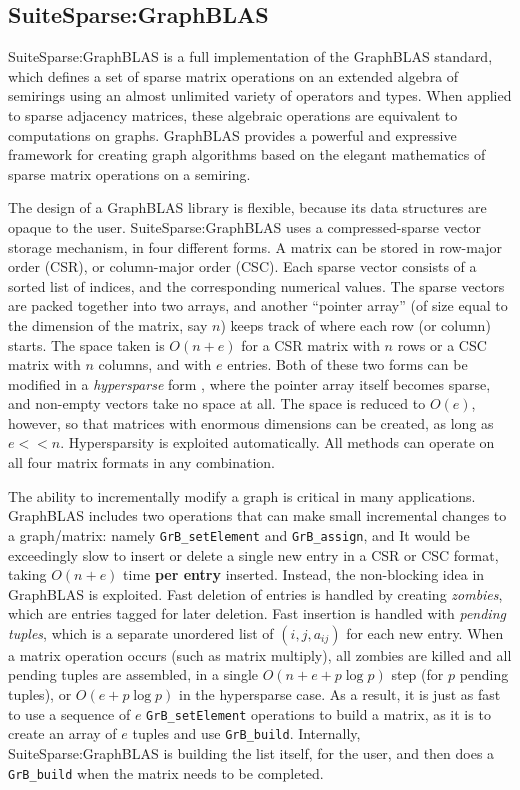 
\subsection{SuiteSparse:GraphBLAS}

SuiteSparse:GraphBLAS is a full implementation of the GraphBLAS standard, which
defines a set of sparse matrix operations on an extended algebra of semirings
using an almost unlimited variety of operators and types.  When applied to
sparse adjacency matrices, these algebraic operations are equivalent to
computations on graphs.  GraphBLAS provides a powerful and expressive framework
for creating graph algorithms based on the elegant mathematics of sparse matrix
operations on a semiring.

The design of a GraphBLAS library is flexible, because its data structures are
opaque to the user.  SuiteSparse:GraphBLAS uses a compressed-sparse vector
storage mechanism, in four different forms.  A matrix can be stored in
row-major order (CSR), or column-major order (CSC).  Each sparse vector
consists of a sorted list of indices, and the corresponding numerical values.
The sparse vectors are packed together into two arrays, and another ``pointer
array'' (of size equal to the dimension of the matrix, say $n$) keeps track of
where each row (or column) starts.  The space taken is $O(n+e)$ for a CSR
matrix with $n$ rows or a CSC matrix with $n$ columns, and with $e$ entries.
Both of these two forms can be modified in a {\em hypersparse} form
\cite{BulucGilbert08}, where the pointer array itself becomes sparse, and
non-empty vectors take no space at all.  The space is reduced to $O(e)$,
however, so that matrices with enormous dimensions can be created, as long as
$e << n$.  Hypersparsity is exploited automatically.  All methods can operate
on all four matrix formats in any combination.

The ability to incrementally modify a graph is critical in many applications.
GraphBLAS includes two operations that can make small incremental changes to a
graph/matrix:  namely \verb'GrB_setElement' and \verb'GrB_assign', and It would
be exceedingly slow to insert or delete a single new entry in a CSR or CSC
format, taking $O(n+e)$ time {\bf per entry} inserted.  Instead, the
non-blocking idea in GraphBLAS is exploited.  Fast deletion of entries is
handled by creating {\em zombies}, which are entries tagged for later deletion.
Fast insertion is handled with {\em pending tuples}, which is a separate
unordered list of $(i,j,a_{ij})$ for each new entry.  When a matrix operation
occurs (such as matrix multiply), all zombies are killed and all pending tuples
are assembled, in a single $O(n+ e + p \log p)$ step (for $p$ pending tuples),
or $O(e +p \log p)$ in the hypersparse case.  As a result, it is just as fast
to use a sequence of $e$ \verb'GrB_setElement' operations to build a matrix, as
it is to create an array of $e$ tuples and use \verb'GrB_build'.  Internally,
SuiteSparse:GraphBLAS is building the list itself, for the user, and then does
a \verb'GrB_build' when the matrix needs to be completed.


